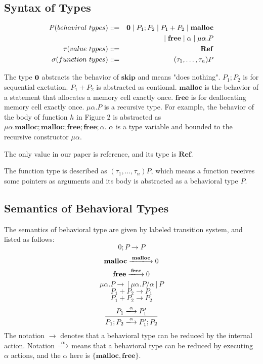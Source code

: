 \documentclass[english]{jssst_ppl} %
\newcommand\tB{\;|\;}
\newcommand\SKIP{\mathbf{skip}}
\newcommand\Malloc{\mathbf{malloc}}
\newcommand\Free{\mathbf{free}}
\begin{document}
\subsection{Syntax of Types}
     \begin{eqnarray*}
       P (behaviral \ types)::=&& {\bf 0} \tB P_{1};P_{2} \tB P_{1}+P_{2} \tB \Malloc\\
       &&\tB \Free \tB \alpha \tB \mu\alpha.P \\
       \tau (value \ types)::=&&    \mathbf{Ref}  \\ %
       \sigma (function \ types)::=&& (\tau_{1},\dots, \tau_{n}) P
     \end{eqnarray*}

The type $\bf 0$ abstracts the behavior of $\SKIP$ and means "does nothing". $P_{1};P_{2}$ is for sequential exetution. $P_{1} + P_{2}$ is abstracted as contional. $\Malloc$ is the behavior of a statement that allocates a memory cell exactly once. $\Free$ is for deallocating memory cell exactly once. $\mu \alpha. P$ is a recursive type. For example, the behavior of  the body of function $h$ in Figure 2 is abstracted as $\mu \alpha. \Malloc;\Malloc;\Free;\Free;\alpha$. $\alpha$ is a type variable and bounded to the recursive constructor $\mu \alpha$.

The only value in our paper is reference, and its type is $\mathbf{Ref}$.

The function type is described as $(\tau_{1}, \dots, \tau_{n})P$, which means a function receives some pointers as arguments and its body is abstracted as a behavioral type $P$.

\subsection{Semantics of Behavioral Types}
The semantics of behavioral type are given by labeled transition system, and listed as follows:
    $$
         0;P \rightarrow P
    $$
    $$
          \Malloc \xlongrightarrow{\Malloc} 0
    $$
    $$
           \Free \xlongrightarrow{\Free} 0
    $$
    $$
          \mu \alpha.P \rightarrow  [\mu \alpha . P/\alpha]  P
    $$
   $$
          P_{1} + P_{2} \longrightarrow P_{1}
   $$
   $$
          P_{1} + P_{2} \longrightarrow P_{2}
   $$
   $$
           \frac{P_{1} \xlongrightarrow{\alpha} P_{1}' }
                 {P_{1};P_{2} \xlongrightarrow{\alpha} P_{1}';P_{2}}
   $$
The notation $\rightarrow$ denotes that a behavioral type can be reduced by the internal action. Notation $\xlongrightarrow{\alpha}$ means that a behavioral type can be reduced by executing $\alpha$ actions, and the $\alpha$ here is $\{\Malloc, \Free\}$.
\end{document}
